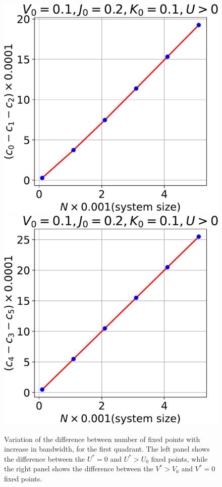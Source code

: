 \documentclass[12pt,twoside]{article}
\numberwithin{equation}{section}
\begin{document}
\begin{figure}[htbp!]
\centering
\includegraphics[scale=0.37]{../figures/frac_vs_D_quad1.pdf}
\includegraphics[scale=0.37]{../figures/frac_vs_D_quad11.pdf}
\caption{Variation of the difference between number of fixed points with increase in bandwidth, for the first quadrant. The left panel shows the difference between the \(U^*=0\) and \(U^*>U_0\) fixed points, while the right panel shows the difference between the \(V^*>V_0\) and \(V^*=0\) fixed points.}
\end{figure}
\end{document}
